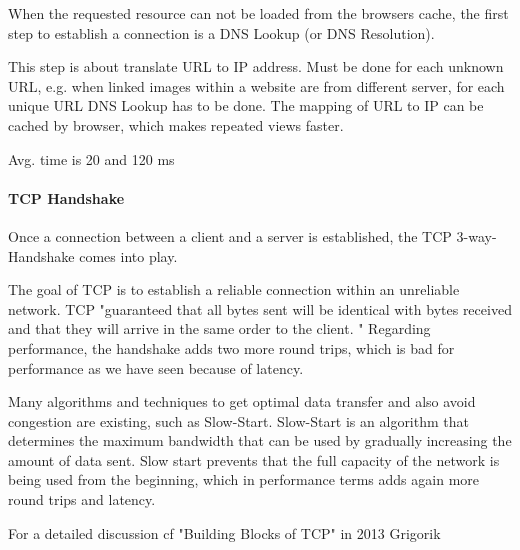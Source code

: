 When the requested resource can not be loaded from the browsers cache, the first step to establish a connection is a DNS Lookup (or DNS Resolution).

This step is about translate URL to IP address.
Must be done for each unknown URL, e.g. when linked images within a website are from different server, for each unique URL DNS Lookup has to be done.
The mapping of URL to IP can be cached by browser, which makes repeated views faster. %

Avg. time is 20 and 120 ms %





\paragraph{TCP Handshake}

Once a connection between a client and a server is established, the TCP 3-way-Handshake comes into play.

The goal of TCP is to establish a reliable connection within an unreliable network.
TCP  "guaranteed that all bytes sent will be identical with bytes received and that they will arrive in the same order to the client. " %
Regarding performance, the handshake adds two more round trips, which is bad for performance as we have seen because of latency.

Many algorithms and techniques to get optimal data transfer and also avoid congestion are existing, such as Slow-Start.
Slow-Start is an algorithm that determines the maximum bandwidth that can be used by gradually increasing the amount of data sent.
Slow start prevents that the full capacity of the network is being used from the beginning, which in performance terms adds again more round trips and latency. %

For a detailed discussion cf "Building Blocks of TCP" in 2013 Grigorik %







